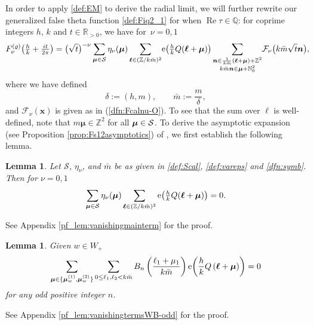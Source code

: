 \documentclass[10pt,a4paper]{amsart}
\def\BZ{\mathbb{Z}}
\def\CF{\mathcal{F}}
\def\CS{\mathcal{S}}
\newcommand{\RR}{\mathbb{R}}
\newcommand{\QQ}{\mathbb{Q}}
\newcommand{\ZZ}{\mathbb{Z}}
\def\bos{\varrho}
\def\bmu{\boldsymbol{\mu}}
\def\bol{\boldsymbol{\ell}}
\def\ex{{\rm e}}
\newtheorem{lem}[thm]{Lemma}
\theoremstyle{definition}
\numberwithin{equation}{section}
\begin{document}
In order to apply \eqref{def:EM} to derive the radial limit, we will further rewrite our generalized false theta function \eqref{def:Fiq2_1} for when $\operatorname{Re}\tau \in \QQ$: for coprime integers $h$, $k$ and $t\in \RR_{>0}$, we have for~$\nu=0,1$
\begin{gather}
	F_\nu^{(\bos)}\bigl(\tfrac{h}{k} +\tfrac{it}{2\pi}\bigr) = \bigl(\sqrt{t}\bigr)^{-\nu} \sum_{\boldsymbol{\mu} \in \CS} \eta_\nu(\boldsymbol{\mu})
	\sum_{ \boldsymbol{\ell}\in (\ZZ/k\bar m)^2 } \! \ex\bigl(\tfrac{h}{k}Q(\bol+\bmu)\bigr)
 	\sum_{\substack{\boldsymbol{n} \in \frac{1}{k\bar m}(\boldsymbol{\ell} +\boldsymbol{\mu} ) + \mathbb{Z}^2\\ k\bar m \boldsymbol{n} \in \bmu + {\mathbb N}_0^2}}\!
	\CF_\nu \bigl( k\bar m \sqrt{t} \boldsymbol{n} \bigr),\!\!\!\label{F112new}
\end{gather}
where we have defined
\begin{equation}\label{dfn:symb}
	\delta:=(h,m),\qquad\bar m:= \frac{m}{ \delta},
\end{equation}
and $\CF_\nu(\boldsymbol{x})$ is given as in (\ref{dfn:Fcalnu-O}).
To see that the sum over $\bol$ is well-defined, note that $m \bmu \in \BZ^2$ for all $\bmu \in {\cal S}$. To derive the asymptotic expansion (see Proposition \ref{prop:Fs12asymptotics}) of \smash{$F_\nu^{(\bos)}$}, we first establish the following lemma.
\begin{lem}
	\label{lem:vanishingmainterm}
	Let $\CS$, $\eta_\nu$, and $\bar m$ be as given in \eqref{def:Scal},
	\eqref{def:vareps} and \eqref{dfn:symb}.
	Then for $\nu=0,1$
	\begin{gather*}%
		\sum_{\bmu\in\CS}\eta_\nu(\bmu)\sum_{\boldsymbol{\ell}\in (\ZZ/k\bar m)^2 }\ex\bigl(\tfrac{h}{k}Q(\bol+\bmu)\bigr) =0.
	\end{gather*}
\end{lem}

See Appendix \ref{pf_lem:vanishingmainterm} for the proof.

{\samepage\begin{lem}
	\label{lem:vanishingtermsWB-odd}
	Given $w\in W_+$
	\begin{equation*}
		\sum_{\bmu\in \{ \bmu_w^{(1)},\bmu_w^{(2)} \}}\sum_{0\leq \ell_1,\ell_2 < k\bar m} B_n\left( \frac{\ell_{1}+\mu_{1}}{k\bar{m}} \right)\ex{\left(\frac{h}{k}Q\left( \bol+\bmu \right)\right)}=0
	\end{equation*}
for any odd positive integer $n$.
\end{lem}

See Appendix \ref{pf_lem:vanishingtermsWB-odd} for the proof.}
\end{document}
